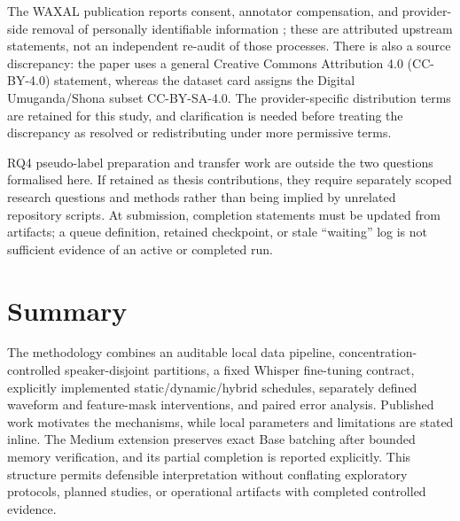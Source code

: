 \documentclass[12pt,a4paper]{report}
\begin{document}
The WAXAL publication reports consent, annotator compensation, and provider-side removal of personally identifiable information \citep{Diack2026}; these are attributed upstream statements, not an independent re-audit of those processes. There is also a source discrepancy: the paper uses a general Creative Commons Attribution 4.0 (CC-BY-4.0) statement, whereas the dataset card assigns the Digital Umuganda/Shona subset CC-BY-SA-4.0. The provider-specific distribution terms are retained for this study, and clarification is needed before treating the discrepancy as resolved or redistributing under more permissive terms.

RQ4 pseudo-label preparation and transfer work are outside the two questions formalised here. If retained as thesis contributions, they require separately scoped research questions and methods rather than being implied by unrelated repository scripts. At submission, completion statements must be updated from artifacts; a queue definition, retained checkpoint, or stale ``waiting'' log is not sufficient evidence of an active or completed run.

\section{Summary}

The methodology combines an auditable local data pipeline, concentration-controlled speaker-disjoint partitions, a fixed Whisper fine-tuning contract, explicitly implemented static/dynamic/hybrid schedules, separately defined waveform and feature-mask interventions, and paired error analysis. Published work motivates the mechanisms, while local parameters and limitations are stated inline. The Medium extension preserves exact Base batching after bounded memory verification, and its partial completion is reported explicitly. This structure permits defensible interpretation without conflating exploratory protocols, planned studies, or operational artifacts with completed controlled evidence.
\end{document}
